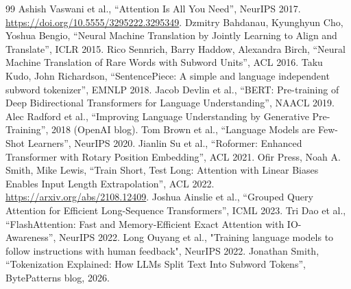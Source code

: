 \documentclass[11pt, a4paper]{article}
\begin{document}
\begin{thebibliography}{99}
 Ashish Vaswani et al., “Attention Is All You Need”, NeurIPS 2017. \url{https://doi.org/10.5555/3295222.3295349}.
 Dzmitry Bahdanau, Kyunghyun Cho, Yoshua Bengio, “Neural Machine Translation by Jointly Learning to Align and Translate”, ICLR 2015.
 Rico Sennrich, Barry Haddow, Alexandra Birch, “Neural Machine Translation of Rare Words with Subword Units”, ACL 2016.
 Taku Kudo, John Richardson, “SentencePiece: A simple and language independent subword tokenizer”, EMNLP 2018.
 Jacob Devlin et al., “BERT: Pre-training of Deep Bidirectional Transformers for Language Understanding”, NAACL 2019.
 Alec Radford et al., “Improving Language Understanding by Generative Pre-Training”, 2018 (OpenAI blog).
 Tom Brown et al., “Language Models are Few-Shot Learners”, NeurIPS 2020.
 Jianlin Su et al., “Roformer: Enhanced Transformer with Rotary Position Embedding”, ACL 2021.
 Ofir Press, Noah A. Smith, Mike Lewis, “Train Short, Test Long: Attention with Linear Biases Enables Input Length Extrapolation”, ACL 2022. \url{https://arxiv.org/abs/2108.12409}.
 Joshua Ainslie et al., “Grouped Query Attention for Efficient Long-Sequence Transformers”, ICML 2023.
 Tri Dao et al., “FlashAttention: Fast and Memory-Efficient Exact Attention with IO-Awareness”, NeurIPS 2022.
 Long Ouyang et al., "Training language models to follow instructions with human feedback", NeurIPS 2022.
 Jonathan Smith, “Tokenization Explained: How LLMs Split Text Into Subword Tokens”, BytePatterns blog, 2026.
\end{thebibliography}
\end{document}

